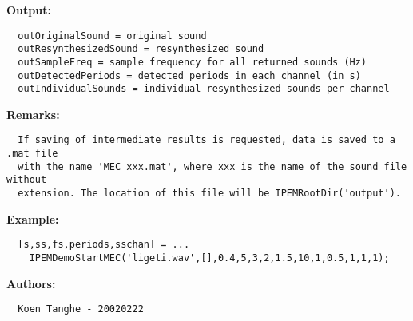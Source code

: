 \textbf{Output:}
\begin{verbatim}  outOriginalSound = original sound
  outResynthesizedSound = resynthesized sound
  outSampleFreq = sample frequency for all returned sounds (Hz)
  outDetectedPeriods = detected periods in each channel (in s)
  outIndividualSounds = individual resynthesized sounds per channel

\end{verbatim}
\textbf{Remarks:}
\begin{verbatim}  If saving of intermediate results is requested, data is saved to a .mat file
  with the name 'MEC_xxx.mat', where xxx is the name of the sound file without
  extension. The location of this file will be IPEMRootDir('output').

\end{verbatim}
\textbf{Example:}
\begin{verbatim}  [s,ss,fs,periods,sschan] = ...
    IPEMDemoStartMEC('ligeti.wav',[],0.4,5,3,2,1.5,10,1,0.5,1,1,1);

\end{verbatim}
\textbf{Authors:}
\begin{verbatim}  Koen Tanghe - 20020222
\end{verbatim}


